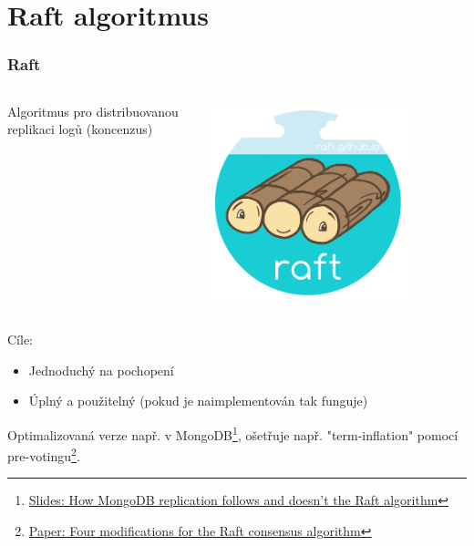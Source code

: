 \documentclass[usenames,dvipsnames,9pt]{beamer}
\begin{document}
\section{Raft algoritmus}

\begin{frame}
  \frametitle{Raft}

  \begin{columns}
    \begin{column}{0.7\textwidth}
      \begin{center}
        \LARGE Algoritmus pro distribuovanou replikaci logů (koncenzus)
      \end{center}
    \end{column}
    \begin{column}{0.3\textwidth}
        \begin{center}
        \includegraphics[width=0.8\textwidth]{12/figs/raft_logo.png}
        \end{center}
    \end{column}
  \end{columns}

  \pause
  Cíle:
  \begin{itemize}
    \item Jednoduchý na pochopení 
    \item Úplný a použitelný (pokud je naimplementován tak funguje) 
  \end{itemize}  


  \vspace{1em}
  \pause
  Optimalizovaná verze např. v MongoDB\footnote{\href{https://henrikingo.github.io/presentations/PGDay\%20Russia\%202017\%20-\%20MongoDB\%20and\%20Raft/\#/title}{Slides: How MongoDB replication follows and doesn't the Raft algorithm}},
  ošetřuje např. "term-inflation" pomocí pre-votingu\footnote{\href{https://www.openlife.cc/sites/default/files/php_uploads/4-modifications-for-Raft-consensus.pdf}{Paper: Four modifications for the Raft consensus algorithm}}.
\end{frame}
\end{document}
